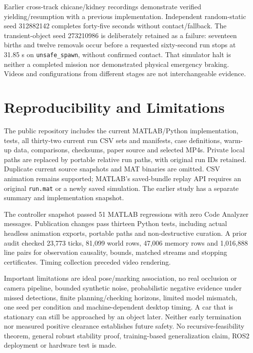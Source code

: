 \documentclass[conference]{IEEEtran}
\begin{document}
Earlier cross-track chicane/kidney recordings demonstrate verified
yielding/resumption with a previous implementation. Independent random-static
seed 312882142 completes forty-five seconds without contact/fallback.
The transient-object seed 273210986 is deliberately retained as a failure:
seventeen births and twelve removals occur before a requested sixty-second
run stops at 31.85 s on \texttt{unsafe\_spawn}, without confirmed contact.
That simulator halt is neither a completed mission nor demonstrated physical
emergency braking. Videos and configurations from different stages are not
interchangeable evidence.

\section{Reproducibility and Limitations}
The public repository includes the current MATLAB/Python implementation,
tests, all thirty-two current run CSV sets and manifests, case definitions,
warm-up data, comparisons, checksums, paper source and selected MP4s.
Private local paths are replaced by portable relative run paths, with
original run IDs retained. Duplicate current source snapshots and MAT binaries
are omitted. CSV animation remains supported; MATLAB's saved-bundle replay
API requires an original \texttt{run.mat} or a newly saved simulation.
The earlier study has a separate summary and implementation snapshot.

The controller snapshot passed 51 MATLAB regressions with zero Code Analyzer
messages. Publication changes pass thirteen Python tests, including actual
headless animation exports, portable paths and non-destructive curation.
A prior audit checked 23,773 ticks, 81,099 world rows, 47,006 memory rows and
1,016,888 line pairs for observation causality, bounds, matched streams and
stopping certificates. Timing collection preceded video rendering.

Important limitations are ideal pose/marking association, no real occlusion
or camera pipeline, bounded synthetic noise, probabilistic negative evidence
under missed detections, finite planning/checking horizons, limited model
mismatch, one seed per condition and machine-dependent desktop timing.
A car that is stationary can still be approached by an object later.
Neither early termination nor measured positive clearance establishes future
safety. No recursive-feasibility theorem, general robust stability proof,
training-based generalization claim, ROS2 deployment or hardware test is made.
\end{document}
